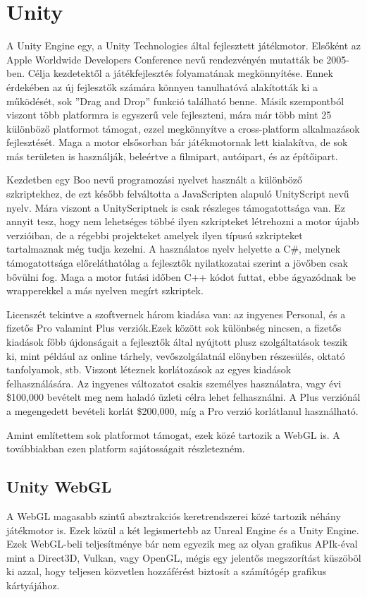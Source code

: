 \section{Unity}
A Unity Engine egy, a Unity Technologies által fejlesztett játékmotor. Elsőként az Apple Worldwide Developers Conference nevű rendezvényén mutatták be 2005-ben. Célja kezdetektől a játékfejlesztés folyamatának megkönnyítése. Ennek érdekében az új fejlesztők számára könnyen tanulhatóvá alakították ki a működését, sok ''Drag and Drop'' funkció található benne. Másik szempontból viszont több platformra is egyszerű vele fejleszteni, mára már több mint 25 különböző platformot támogat, ezzel megkönnyítve a cross-platform alkalmazások fejlesztését. Maga a motor elsősorban bár játékmotornak lett kialakítva, de sok más területen is használják, beleértve a filmipart, autóipart, és az építőipart.

Kezdetben egy Boo nevű programozási nyelvet használt a különböző szkriptekhez, de ezt később felváltotta a JavaScripten alapuló UnityScript nevű nyelv. Mára viszont a UnityScriptnek is csak részleges támogatottsága van. Ez annyit tesz, hogy nem lehetséges többé ilyen szkripteket létrehozni a motor újabb verzióiban, de a régebbi projekteket amelyek ilyen típusú szkripteket tartalmaznak még tudja kezelni. A használatos nyelv helyette a C\#, melynek támogatottsága előreláthatólag a fejlesztők nyilatkozatai szerint a jövőben csak bővülni fog. Maga a motor futási időben C++ kódot futtat, ebbe ágyazódnak be wrapperekkel a más nyelven megírt szkriptek.

Licenszét tekintve a szoftvernek három kiadása van: az ingyenes Personal, és a fizetős Pro valamint Plus verziók.Ezek között sok különbség nincsen, a fizetős kiadások főbb újdonságait a fejlesztők által nyújtott plusz szolgáltatások teszik ki, mint például az online tárhely, vevőszolgálatnál előnyben részesülés, oktató tanfolyamok, stb. Viszont léteznek korlátozások az egyes kiadások felhasználására. Az ingyenes változatot csakis személyes használatra, vagy évi \$100,000 bevételt meg nem haladó üzleti célra lehet felhasználni. A Plus verziónál a megengedett bevételi korlát \$200,000, míg a Pro verzió korlátlanul használható.

Amint említettem sok platformot támogat, ezek közé tartozik a WebGL is. A továbbiakban ezen platform sajátosságait részletezném.
\subsection{Unity WebGL}
A WebGL magasabb szintű absztrakciós keretrendszerei közé tartozik néhány játékmotor is. Ezek közül a két legismertebb az Unreal Engine és a Unity Engine. Ezek WebGL-beli teljesítménye bár nem egyezik meg az olyan grafikus APIk-éval mint a Direct3D, Vulkan, vagy OpenGL, mégis egy jelentős megszorítást küszöböl ki azzal, hogy teljesen közvetlen hozzáférést biztosít a számítógép grafikus kártyájához.

